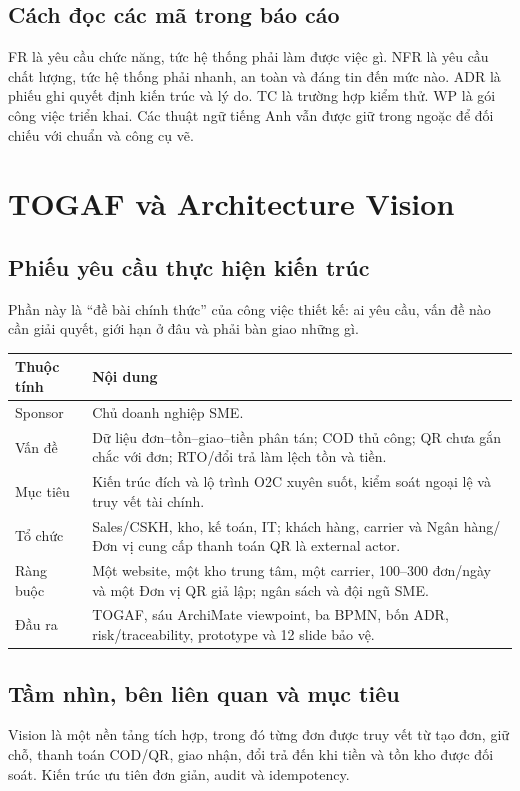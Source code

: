 \documentclass[12pt,a4paper]{report}
\begin{document}
\section{Cách đọc các mã trong báo cáo}
FR là yêu cầu chức năng, tức hệ thống phải làm được việc gì. NFR là yêu cầu chất lượng, tức hệ thống phải nhanh, an toàn và đáng tin đến mức nào. ADR là phiếu ghi quyết định kiến trúc và lý do. TC là trường hợp kiểm thử. WP là gói công việc triển khai. Các thuật ngữ tiếng Anh vẫn được giữ trong ngoặc để đối chiếu với chuẩn và công cụ vẽ.

\chapter{TOGAF và Architecture Vision}

\section{Phiếu yêu cầu thực hiện kiến trúc}
Phần này là ``đề bài chính thức'' của công việc thiết kế: ai yêu cầu, vấn đề nào cần giải quyết, giới hạn ở đâu và phải bàn giao những gì.
\begin{longtable}{p{}p{}}
\toprule
\textbf{Thuộc tính} & \textbf{Nội dung}\\
\midrule\endhead
Sponsor & Chủ doanh nghiệp SME.\\
Vấn đề & Dữ liệu đơn--tồn--giao--tiền phân tán; COD thủ công; QR chưa gắn chắc với đơn; RTO/đổi trả làm lệch tồn và tiền.\\
Mục tiêu & Kiến trúc đích và lộ trình O2C xuyên suốt, kiểm soát ngoại lệ và truy vết tài chính.\\
Tổ chức & Sales/CSKH, kho, kế toán, IT; khách hàng, carrier và Ngân hàng/Đơn vị cung cấp thanh toán QR là external actor.\\
Ràng buộc & Một website, một kho trung tâm, một carrier, 100--300 đơn/ngày và một Đơn vị QR giả lập; ngân sách và đội ngũ SME.\\
Đầu ra & TOGAF, sáu ArchiMate viewpoint, ba BPMN, bốn ADR, risk/traceability, prototype và 12 slide bảo vệ.\\
\bottomrule
\end{longtable}

\section{Tầm nhìn, bên liên quan và mục tiêu}
Vision là một nền tảng tích hợp, trong đó từng đơn được truy vết từ tạo đơn, giữ chỗ, thanh toán COD/QR, giao nhận, đổi trả đến khi tiền và tồn kho được đối soát. Kiến trúc ưu tiên đơn giản, audit và idempotency.
\end{document}
